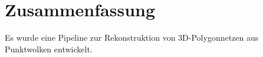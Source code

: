 
\chapter{Zusammenfassung}
\label{ch:zusammenfassung}

Es wurde eine Pipeline zur Rekonstruktion von 3D-Polygonnetzen aus Punktwolken entwickelt.

